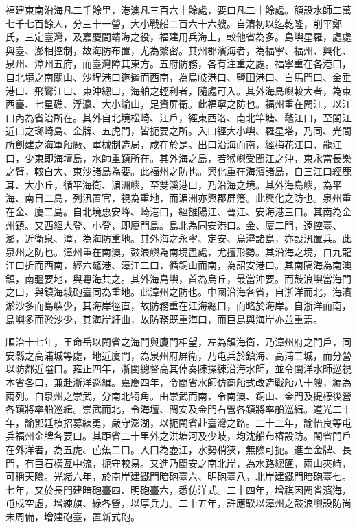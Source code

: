 \begin{pinyinscope}
福建東南沿海凡二千餘里，港澳凡三百六十餘處，要口凡二十餘處。額設水師二萬七千七百餘人，分三十一營，大小戰船二百六十六艘。自清初以迄乾隆，削平鄭氏，三定臺灣，及嘉慶間靖海之役，福建用兵海上，較他省為多。島嶼星羅，處處與臺、澎相控制，故海防布置，尤為繁密。其州郡濱海者，為福寧、福州、興化、泉州、漳州五府，而臺灣障其東方。五府防務，各有注重之處。福寧重在各港口，自北境之南關山、沙埕港口迤邐而西南，為烏岐港口、鹽田港口、白馬門口、金垂港口、飛鸞江口、東沖總口，海舶之輕利者，隨處可入。其外海島嶼較大者，為東西臺、七星礁、浮瀛、大小崳山，足資屏衛。此福寧之防也。福州重在閩江，以江口內為省治所在。其外自北境松崎、江戶，經東西洛、南北竿塘、鼇江口，至閩江近口之瑯崎島、金牌、五虎門，皆扼要之所。入口經大小嶼、羅星塔，乃同、光間所創建之海軍船廠、軍械制造局，咸在於是。出口沿海而南，經梅花江口、龍江口，少東即海壇島，水師重鎮所在。其外海之島，若猴嶼受閩江之沖，東永當長樂之臂，較白大、東沙諸島為要。此福州之防也。興化重在海濱諸島，自三江口經鹿耳、大小丘，循平海衛、湄洲嶼，至雙溪港口，乃沿海之境。其外海島嶼，為平海、南日二島，列汛置官，視為重地，而湄洲亦興郡屏籓。此興化之防也。泉州重在金、廈二島。自北境惠安峰、崎港口，經雒陽江、晉江、安海港三口。其南為金州鎮。又西經大登、小登，即廈門島。島北為同安港口。金、廈二門，遠控臺、澎，近衛泉、漳，為海防重地。其外海之永寧、定安、烏潯諸島，亦設汛置兵。此泉州之防也。漳州重在南澳，鼓浪嶼為南境盡處，尤擅形勢。其沿海之境，自九龍江口折而西南，經六鼇港、漳江二口，循銅山而南，為詔安港口。其南隔海為南澳鎮，南疆要地，與粵海共之。其外海島嶼，首為烏丘，最當沖要。而鼓浪嶼當海門之口，與鎮海城砲臺同為重地。此漳州之防也。中國沿海各省，自浙洋而北，海濱淤沙多而島嶼少，其海岸徑直，故防務重在江海總口，而略於海岸。自浙洋而南，島嶼多而淤沙少，其海岸紆曲，故防務既重海口，而巨島與海岸亦並重焉。

順治十七年，王命岳以閩省之海門與廈門相望，左為鎮海衛，乃漳州府之門戶，同安縣之高浦城等處，地近廈門，為泉州府屏衛，乃屯兵於鎮海、高浦二城，而分營以防鄰近隘口。雍正四年，浙閩總督高其倬奏陳操練沿海水師，並令閩洋水師巡視本省各口，兼赴浙洋巡緝。嘉慶四年，令閩省水師仿商船式改造戰船八十艘，編為兩列。自泉州之崇武，分南北犄角。由崇武而南，令南澳、銅山、金門及提標後營各鎮將率船巡緝。崇武而北，令海壇、閩安及金門右營各鎮將率船巡緝。道光二十年，諭鄧廷楨招募練勇，嚴守澎湖，以扼閩省赴臺灣之路。二十二年，諭怡良等屯兵福州金牌各要口。其距省二十里外之洪塘河及少岐，均沈船布椿設防。閩省門戶在外洋者，為五虎、芭蕉二口。入口為壺江，水勢稍狹，無險可扼。進至金牌、長門，有巨石橫亙中流，扼守較易。又進乃閩安之南北岸，為水路總匯，兩山夾峙，可稱天險。光緒六年，於南岸建鐵門暗砲臺六、明砲臺八，北岸建鐵門暗砲臺七。七年，又於長門建暗砲臺四、明砲臺六，悉仿洋式。二十四年，增祺因閩省濱海，屯戍空虛，增練旗、綠各營，以厚兵力。二十五年，許應騤以漳州之鼓浪嶼設防尚未周備，增建砲臺，置新式砲。


\end{pinyinscope}
